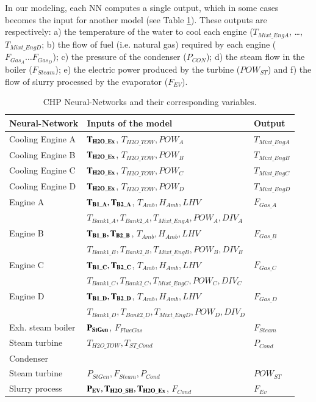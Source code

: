 In our modeling,  each NN computes a single output, which in some cases becomes the input for another model (see Table \ref{fignns}).  These outputs are respectively: a) the temperature of the water to cool each engine ($T_{Mixt\_EngA}$, \dots, $T_{Mixt\_EngD}$; b) the flow of fuel (i.e. natural gas) required by each engine ($F_{Gas_A} \dots F_{Gas_D}$); c) the pressure of the condenser ($P_{CON}$); d) the steam flow in the boiler ($F_{Steam}$); e) the electric power produced by the turbine ($POW_{ST}$) and f) the flow of slurry processed by the evaporator ($F_{EV}$).

\begin{table}[!t]
\caption{CHP Neural-Networks and their corresponding variables.}
\label{fignns}
  \centering
\begin{tabular}{lll} \toprule
 Neural-Network  & Inputs of the model & Output \\ \midrule
Cooling Engine A & $\bf{T_{H2O\_Ex}}$, $T_{H2O\_TOW}, POW_A $ & $T_{Mixt\_EngA} $ \\
Cooling Engine B & $\bf{T_{H2O\_Ex}}$, $T_{H2O\_TOW}, POW_B $ & $T_{Mixt\_EngB} $ \\
Cooling Engine C & $\bf{T_{H2O\_Ex}}$, $T_{H2O\_TOW}, POW_C $ & $T_{Mixt\_EngC} $ \\
Cooling Engine D& $\bf{T_{H2O\_Ex}}$, $T_{H2O\_TOW}, POW_D $ & $T_{Mixt\_EngD} $ \\

 Engine A& $\bf{T_{B1\_A}, T_{B2\_A}}$, $T_{Amb}, H_{Amb}, LHV $ & $F_{Gas\_A} $ \\
 & $T_{Bank1\_A}, T_{Bank2\_A}, T_{Mixt\_EngA}, POW_A, DIV_A $ &  \\
 
 Engine B& $\bf{T_{B1\_B}, T_{B2\_B}}$, $T_{Amb}, H_{Amb}, LHV $ & $F_{Gas\_B} $ \\
 & $T_{Bank1\_B}, T_{Bank2\_B}, T_{Mixt\_EngB}, POW_B, DIV_B $ &  \\
 
 Engine C& $\bf{T_{B1\_C}, T_{B2\_C}}$, $T_{Amb}, H_{Amb}, LHV $ & $F_{Gas\_C} $ \\
 & $T_{Bank1\_C}, T_{Bank2\_C}, T_{Mixt\_EngC}, POW_C, DIV_C $ &  \\
 
 Engine D& $\bf{T_{B1\_D}, T_{B2\_D}}$, $T_{Amb}, H_{Amb}, LHV $ & $F_{Gas\_D} $ \\
 & $T_{Bank1\_D}, T_{Bank2\_D}, T_{Mixt\_EngD}, POW_D, DIV_D $ &  \\ 
 
Exh. steam boiler & $\bf{P_{StGen}}$, $F_{FlueGas}$ & $F_{Steam} $ \\
Steam turbine & $T_{H2O\_TOW}, T_{ST\_Cond}$ & $P_{Cond} $ \\
Condenser & & \\
Steam turbine & $P_{StGen}, F_{Steam}, P_{Cond}$ & $POW_{ST} $ \\
Slurry process & $\bf{P_{EV}, T_{H2O\_SH}, T_{H2O\_Ex}}$, $F_{Cond} $ & $F_{Ev}$ \\ \midrule


\end{tabular}
\vspace{-0.3cm}

\end{table}

